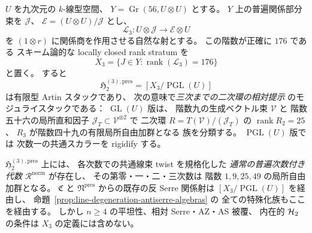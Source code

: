 \begin{proposition}[三次Hilbert値までの相対二次提示のスタック]
\label{prop:truncated-antiserre-moduli-stack}
$U$ を九次元の $k$-線型空間、
$Y=\operatorname{Gr}(56,U\otimes U)$ とする。
$Y$ 上の普遍関係部分束を $\mathcal J$、
$\mathcal E=(U\otimes U)/\mathcal J$ とし、
\[
 \mathcal L_3:
 U\otimes\mathcal J\longrightarrow
 \mathcal E\otimes U
\]
を $(1\otimes r)$ に関係商を作用させる自然な射とする。
この階数が正確に $176$ である
スキーム論的な locally closed rank stratum を
\[
 X_3=\{J\in Y:\operatorname{rank}(\mathcal L_3)=176\}
 \tag{H2-X3}\label{eq:truncated-antiserre-locus}
\]
と置く。
すると
\[
 \boxed{\quad
 \mathfrak H_2^{(3),\mathrm{pres}}
 = [X_3/\operatorname{PGL}(U)]
 \quad}
 \tag{H2-trunc}\label{eq:truncated-antiserre-stack}
\]
は有限型 Artin スタックであり、
次の意味で\emph{三次までの二次環の相対提示}
のモジュライスタックである：
$\operatorname{GL}(U)$ 版は、
階数九の生成ベクトル束 $\mathcal V$ と
階数五十六の局所直和因子
$\mathcal J_T\subset\mathcal V^{\otimes2}$ で
二次環 $R=T(\mathcal V)/(\mathcal J_T)$ の
$\operatorname{rank}R_2=25$、
$R_3$ が階数四十九の有限局所自由加群となる
族を分類する。
$\operatorname{PGL}(U)$ 版では
次数一の共通スカラーを rigidify する。

$\mathfrak H_2^{(3),\mathrm{pres}}$ 上には、
各次数での共通線束 twist を規格化した
\emph{通常の普遍次数付き代数}
$\mathcal R^{\mathrm{norm}}$ が存在し、
その第零・一・二・三次数は
階数 $1,9,25,49$ の局所自由加群となる。
$\mathfrak C$ と $\mathfrak N^{\mathrm{pres}}$
からの既存の反 Serre 関係射は
$[X_3/\operatorname{PGL}(U)]$ を経由し、
命題~\ref{prop:line-degeneration-antiserre-algebras} の
全ての特殊化族もここを経由する。
しかし $n\ge4$ の平坦性、相対 Serre・AZ・AS 被覆、
内在的 $\mathcal H_2$ の条件は $X_3$ の定義には含めない。
\end{proposition}
